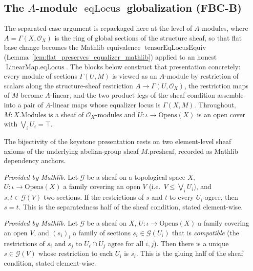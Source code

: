 \subsection{The \texorpdfstring{$A$}{A}-module \texorpdfstring{$\operatorname{eqLocus}$}{eqLocus} globalization (FBC-B)}

The separated-case argument is repackaged here at the level of \(A\)-modules, where
\(A = \Gamma(X,\mathcal{O}_X)\) is the ring of global sections of the structure sheaf, so that flat
base change becomes the Mathlib equivalence \(\operatorname{tensorEqLocusEquiv}\)
(Lemma~\ref{lem:flat_preserves_equalizer_mathlib}) applied to an honest
\(\operatorname{LinearMap.eqLocus}\). The blocks below construct that presentation concretely: every
module of sections \(\Gamma(U, M)\) is viewed as an \(A\)-module by restriction of scalars along the
structure-sheaf restriction \(A \to \Gamma(U,\mathcal{O}_X)\), the restriction maps of \(M\) become
\(A\)-linear, and the two product legs of the sheaf condition assemble into a pair of \(A\)-linear maps
whose equalizer locus is \(\Gamma(X, M)\). Throughout, \(M : X.\mathrm{Modules}\) is a sheaf of
\(\mathcal{O}_X\)-modules and \(U : \iota \to \mathrm{Opens}(X)\) is an open cover with
\(\bigvee_i U_i = \top\).

The bijectivity of the keystone presentation rests on two element-level sheaf axioms of the underlying
abelian-group sheaf \(M.\mathrm{presheaf}\), recorded as Mathlib dependency anchors.

\begin{lemma}
  \label{lem:sheaf_eq_of_locally_eq_mathlib}
  \mathlibok
  \textit{Provided by Mathlib.}
  Let \(\mathcal{G}\) be a sheaf on a topological space \(X\), \(U : \iota \to \mathrm{Opens}(X)\) a
  family covering an open \(V\) (i.e.\ \(V \le \bigvee_i U_i\)), and \(s, t \in \mathcal{G}(V)\) two
  sections. If the restrictions of \(s\) and \(t\) to every \(U_i\) agree, then \(s = t\). This is the
  separatedness half of the sheaf condition, stated element-wise.
\end{lemma}

\begin{lemma}
  \label{lem:sheaf_existsUnique_gluing_mathlib}
  \mathlibok
  \textit{Provided by Mathlib.}
  Let \(\mathcal{G}\) be a sheaf on \(X\), \(U : \iota \to \mathrm{Opens}(X)\) a family covering an open
  \(V\), and \((s_i)_i\) a family of sections \(s_i \in \mathcal{G}(U_i)\) that is \emph{compatible}
  (the restrictions of \(s_i\) and \(s_j\) to \(U_i \cap U_j\) agree for all \(i, j\)). Then there is a
  unique \(s \in \mathcal{G}(V)\) whose restriction to each \(U_i\) is \(s_i\). This is the gluing half
  of the sheaf condition, stated element-wise.
\end{lemma}

